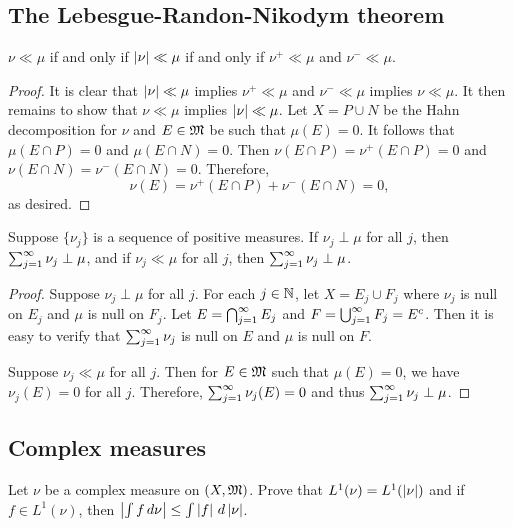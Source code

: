 \documentclass[a4paper]{article}
\begin{document}
\subsection{The Lebesgue-Randon-Nikodym theorem}

\begin{ex}[Folland 3.8]
$\nu \ll \mu$ if and only if $\left\lvert \nu\right\rvert \ll \mu$ 
if and only if $\nu^+ \ll \mu$ and $\nu^- \ll \mu$.
\end{ex}

\begin{proof}
It is clear that $\left\lvert \nu\right\rvert \ll \mu$ implies 
$\nu^+ \ll \mu$ and $\nu^- \ll \mu$ implies 
$\nu \ll \mu$. It then remains to show that $\nu \ll \mu$ 
implies $\left\lvert \nu\right\rvert \ll \mu$. Let $X = P \cup N$ be the Hahn 
decomposition for $\nu$ and $E \in \mathfrak{M}$ be such that 
$\mu(E) = 0$. It follows that 
$\mu(E \cap P) = 0$ and $\mu (E \cap N) = 0$. Then 
$\nu(E \cap P) = \nu^+ (E \cap P) = 0$ and 
$\nu(E \cap N) = \nu^- (E \cap N) = 0$. Therefore, 
\[
\nu (E) = \nu^+ (E \cap P) + \nu^- (E \cap N) = 0,
\]
as desired.
\end{proof}

\begin{ex}[Folland 3.9]
Suppose $\{\nu_j\}$ is a sequence of positive measures.
If $\nu_j \perp \mu$ for all $j$, then $\sum_{j=1}^\infty \nu_j \perp \mu$, 
and if $\nu_j \ll \mu$ for all $j$, then $\sum_{j=1}^\infty \nu_j 
\perp \mu$.
\end{ex}

\begin{proof}
Suppose $\nu_j \perp \mu$ for all $j$. 
For each $j \in \mathbb{N}$, let $X = E_j \cup F_j$ where $\nu_j$
is null on $E_j$ and $\mu$ is null on $F_j$. Let 
$E = \bigcap_{j=1}^\infty E_j$ and $F = \bigcup_{j=1}^\infty F_j = E^c$. Then it is 
easy to verify that $\sum_{j=1}^\infty \nu_j$ is null on $E$ and 
$\mu$ is null on $F$.

Suppose $\nu_j \ll \mu$ for all $j$. Then for $E \in \mathfrak{M}$ such that 
$\mu(E) = 0$, we have $\nu_j (E) = 0$ for all $j$. Therefore,
$\sum_{j=1}^\infty \nu_j (E) = 0$ and thus $\sum_{j=1}^\infty \nu_j \perp \mu$.
\end{proof}

\subsection{Complex measures}

\begin{ex}[Folland 3.18]
Let $\nu$ be a complex measure on $(X, \mathfrak{M})$. Prove that 
$L^1 (\nu) = L^1 (\left\lvert \nu\right\rvert)$ and if $f \in L^1 (\nu)$, then 
$\left\lvert \int f \, d \nu\right\rvert \leq \int \left\lvert f\right\rvert \, d \left\lvert \nu\right\rvert$.
\end{ex}
\end{document}
